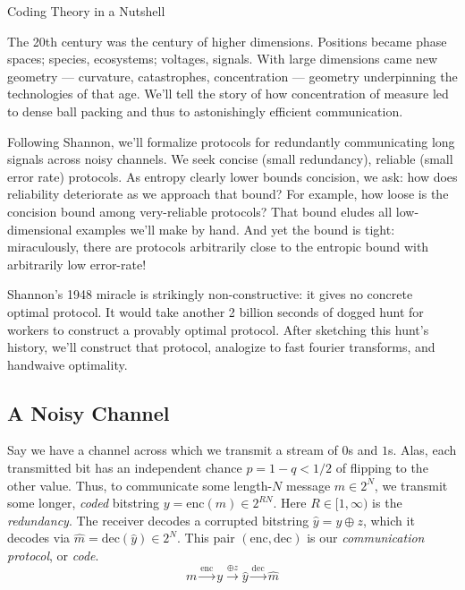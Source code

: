 \documentclass[12pt]{article}
\newcommand{\msec}[1]{\subsection*{\color{mblu}\textsf{#1}}}
\newcommand{\mpar}[1]{%
    \makebox[0cm]{\hspace{-4.75cm}\parbox{2.5cm}{\raggedleft\color{mblulite}\textsf{#1}}}%
}
\theoremstyle{definition}
\newcommand{\enc}{\text{enc}}
\newcommand{\dec}{\text{dec}}
\begin{document}
{
    \centering \Huge \sf \color{mblu} 
    Coding Theory in a Nutshell
    \vspace{0.5cm}
}


The 20th century was the century of higher dimensions.  Positions became phase
spaces; species, ecosystems; voltages, signals.  With large dimensions came new
geometry --- curvature, catastrophes, concentration --- geometry underpinning
the technologies of that age.  We'll tell the story of how concentration of
measure led to dense ball packing and thus to astonishingly efficient
communication.

Following Shannon, we'll formalize protocols for redundantly communicating long
signals across noisy channels.  We seek concise (small redundancy), reliable
(small error rate) protocols.  As entropy clearly lower bounds concision, we
ask: how does reliability deteriorate as we approach that bound?  For example,
how loose is the concision bound among very-reliable protocols?  That bound
eludes all low-dimensional examples we'll make by hand.  And yet the bound is
tight: miraculously, there are protocols arbitrarily close to the entropic
bound with arbitrarily low error-rate!

Shannon's 1948 miracle is strikingly non-constructive: it gives no concrete
optimal protocol.  It would take another 2 billion seconds of dogged hunt for
workers to construct a provably optimal protocol.  After sketching this hunt's
history, we'll construct that protocol, analogize to fast fourier transforms,
and handwaive optimality.

\msec{A Noisy Channel}

    \indent\par
    \mpar{redundancy}%
    Say we have a channel across which we transmit a stream of $0$s and $1$s.
    Alas, each transmitted bit has an independent chance $p=1-q<1/2$ of
    flipping to the other value.  Thus, to communicate some length-$N$ message
    $m\in 2^N$, we transmit some longer, \emph{coded} bitstring
    $y=\enc(m)\in 2^{RN}$.  Here $R\in [1,\infty)$ is the
    \emph{redundancy}.  The receiver decodes a corrupted bitstring $\hat y = y
    \oplus z$, which it decodes via $\hat m = \dec(\hat y) \in 2^N$.
    This pair $(\enc, \dec)$ is our \emph{communication protocol},
    or \emph{code}. 
    $$
         m  \xrightarrow{\enc}
         y  \xrightarrow{\oplus z}
    \hat y  \xrightarrow{\dec}
    \hat m
    $$
\end{document}
